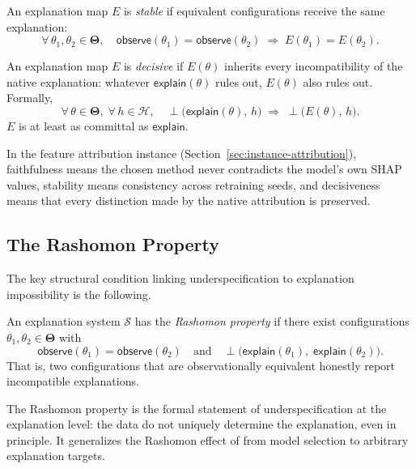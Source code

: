 \documentclass[twoside]{jmlr}
\newcommand{\Params}{\mathbf{\Theta}}         %
\newcommand{\sH}{\mathcal{H}}
\newcommand{\incomp}{\perp}                  %
\begin{document}
\begin{definition}[Stable]
\label{def:stable}
An explanation map $E$ is \emph{stable} if equivalent configurations receive
the same explanation:
\[
  \forall\,\theta_1, \theta_2 \in \Params,\quad
  \mathsf{observe}(\theta_1) = \mathsf{observe}(\theta_2)
  \;\Longrightarrow\;
  E(\theta_1) = E(\theta_2).
\]
\end{definition}

\begin{definition}[Decisive]
\label{def:decisive}
An explanation map $E$ is \emph{decisive} if $E(\theta)$ inherits every
incompatibility of the native explanation: whatever
$\mathsf{explain}(\theta)$ rules out, $E(\theta)$ also rules out.  Formally,
\[
  \forall\,\theta \in \Params,\;\forall\,h \in \sH,\quad
  \incomp\bigl(\mathsf{explain}(\theta),\, h\bigr)
  \;\Longrightarrow\;
  \incomp\bigl(E(\theta),\, h\bigr).
\]
$E$ is at least as committal as $\mathsf{explain}$.
\end{definition}

In the feature attribution instance (Section~\ref{sec:instance-attribution}),
faithfulness means the chosen method never contradicts the model's own SHAP
values, stability means consistency across retraining seeds, and decisiveness
means that every distinction made by the native attribution is preserved.

\subsection{The Rashomon Property}

The key structural condition linking underspecification to explanation
impossibility is the following.

\begin{definition}
\label{def:rashomon}
An explanation system $\mathcal{S}$ has the \emph{Rashomon property} if there
exist configurations $\theta_1, \theta_2 \in \Params$ with
\[
  \mathsf{observe}(\theta_1) = \mathsf{observe}(\theta_2)
  \quad\text{and}\quad
  \incomp\bigl(\mathsf{explain}(\theta_1),\;\mathsf{explain}(\theta_2)\bigr).
\]
That is, two configurations that are observationally equivalent honestly report
incompatible explanations.
\end{definition}

The Rashomon property is the formal statement of underspecification at the
explanation level: the data do not uniquely determine the explanation, even in
principle.  It generalizes the Rashomon effect of
\citet{rudin2024amazing,fisher2019models} from model selection to arbitrary
explanation targets.
\end{document}

